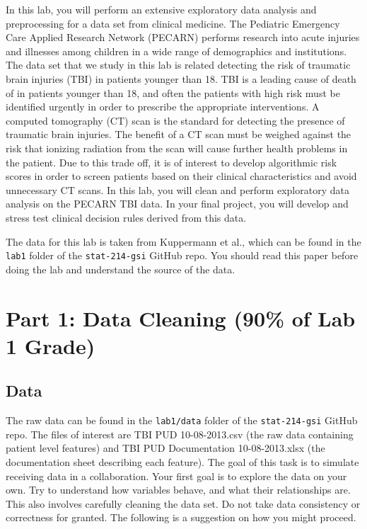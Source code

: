 \documentclass[10pt,letterpaper]{article}
\begin{document}
In this lab, you will perform an extensive exploratory data analysis and preprocessing for a data set from clinical medicine. The Pediatric Emergency Care Applied Research Network (PECARN) performs research into acute injuries and illnesses among children in a wide range of demographics and institutions. The data set that we study in this lab is related detecting the risk of traumatic brain injuries (TBI) in patients younger than 18. TBI is a leading cause of death of in patients younger than 18, and often the patients with high risk must be identified urgently in order to prescribe the appropriate interventions. A computed tomography (CT) scan is the standard for detecting the presence of traumatic brain injuries. The benefit of a CT scan must be weighed against the risk that ionizing radiation from the scan will cause further health problems in the patient. Due to this trade off, it is of interest to develop algorithmic risk scores in order to screen patients based on their clinical characteristics and avoid unnecessary CT scans. In this lab, you will clean and perform exploratory data analysis on the PECARN TBI data. In your final project, you will develop and stress test clinical decision rules derived from this data.

The data for this lab is taken from Kuppermann et al., which can be found in the \texttt{lab1} folder of the \texttt{stat-214-gsi} GitHub repo. You should read this paper before doing the lab and understand the source of the data.

\section*{Part 1: Data Cleaning (90\% of Lab 1 Grade)}
\subsection*{Data}

The raw data can be found in the \texttt{lab1/data} folder of the \texttt{stat-214-gsi} GitHub repo. The files of interest are TBI PUD 10-08-2013.csv (the raw data containing patient level features) and TBI PUD Documentation 10-08-2013.xlsx (the documentation sheet describing each feature). The goal of this task is to simulate receiving data in a collaboration. Your first goal is to explore the data on your own. Try to understand how variables behave, and what their relationships are. This also involves carefully cleaning the data set. Do not take data consistency or correctness for granted. The following is a suggestion on how you might proceed.
\end{document}
